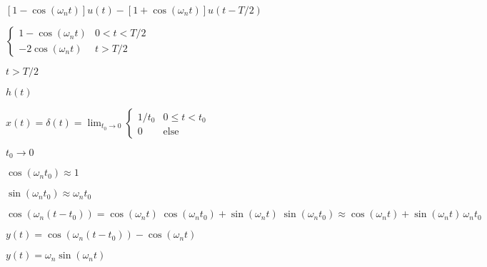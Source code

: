 \documentclass{article}
\def\lthtmlcheckvsize{\ifdim\ht\sizebox<\vsize 
  \ifdim\wd\sizebox<\hsize\expandafter\hfill\fi \expandafter\vfill
  \else\expandafter\vss\fi}%
\begin{document}
{\newpage\clearpage
{}%
$\displaystyle [1-\cos(\omega_nt)]u(t)-[1+\cos(\omega_nt)]u(t-T/2)$%
\lthtmlindisplaymathZ
\lthtmlcheckvsize\clearpage}

{\newpage\clearpage
{}%
$\displaystyle \left\{\begin{array}{cl}1-\cos(\omega_nt) & 0<t<T/2 \\
-2\cos(\omega_nt) & t>T/2 \end{array} \right.$%
\lthtmlindisplaymathZ
\lthtmlcheckvsize\clearpage}

{\newpage\clearpage
{}%
$ t>T/2$%
\lthtmlindisplaymathZ
\lthtmlcheckvsize\clearpage}

{\newpage\clearpage
{}%
$ h(t)$%
\lthtmlindisplaymathZ
\lthtmlcheckvsize\clearpage}

{\newpage\clearpage
{}%
$\displaystyle x(t)=\delta(t)=\lim_{t_0\rightarrow 0}\left\{ \begin{array}{cl}
1/t_0 & 0\le t< t_0 \\0 & \mbox{else} \end{array}\right.$%
\lthtmlindisplaymathZ
\lthtmlcheckvsize\clearpage}

{\newpage\clearpage
{}%
$ t_0\rightarrow 0$%
\lthtmlindisplaymathZ
\lthtmlcheckvsize\clearpage}

{\newpage\clearpage
{}%
$ \cos(\omega_nt_0)\approx 1$%
\lthtmlindisplaymathZ
\lthtmlcheckvsize\clearpage}

{\newpage\clearpage
{}%
$ \sin(\omega_nt_0)\approx \omega_nt_0$%
\lthtmlindisplaymathZ
\lthtmlcheckvsize\clearpage}

{\newpage\clearpage
{}%
$\displaystyle \cos(\omega_n(t-t_0))=\cos(\omega_nt)\;\cos(\omega_nt_0)+\sin(\omega_nt)\;
\sin(\omega_nt_0)  \approx\cos(\omega_nt)+\sin(\omega_nt)\,\omega_nt_0$%
\lthtmlindisplaymathZ
\lthtmlcheckvsize\clearpage}

{\newpage\clearpage
{}%
$ y(t)=\cos(\omega_n(t-t_0))-\cos(\omega_nt)$%
\lthtmlindisplaymathZ
\lthtmlcheckvsize\clearpage}

{\newpage\clearpage
{}%
$\displaystyle y(t)=\omega_n\sin(\omega_nt)$%
\lthtmlindisplaymathZ
\lthtmlcheckvsize\clearpage}
\end{document}
